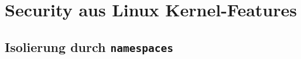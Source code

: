 \documentclass[../main.tex]{subfiles}
\begin{document}








\chapter{Security aus Linux Kernel-Features}
\label{secLinux}
	\section{Isolierung durch \texttt{namespaces}}
  \label{secIsolierung}
\end{document}
